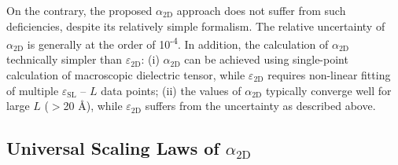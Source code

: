 On the contrary, the proposed $\alpha_{\mathrm{2D}}$ approach does not
suffer from such deficiencies, despite its relatively simple
formalism. The relative uncertainty of $\alpha_{\mathrm{2D}}$ is
generally at the order of 10\textsuperscript{-4}. In addition, the
calculation of $\alpha_{\mathrm{2D}}$ technically simpler than
$\varepsilon_{\mathrm{2D}}$: (i) $\alpha_{\mathrm{2D}}$ can be
achieved using single-point calculation of macroscopic dielectric
tensor, while $\varepsilon_{\mathrm{2D}}$ requires non-linear fitting
of multiple $\varepsilon_{\mathrm{SL}}$ -- $L$ data points; (ii) the
values of $\alpha_{\mathrm{2D}}$ typically converge well for large $L$
($>$20 \AA{}), while $\varepsilon_{\mathrm{2D}}$ suffers from the
uncertainty as described above.



\subsection{Universal Scaling Laws of $\alpha_{\mathrm{2D}}$}
\label{sec:diel-univ-scal-laws}

